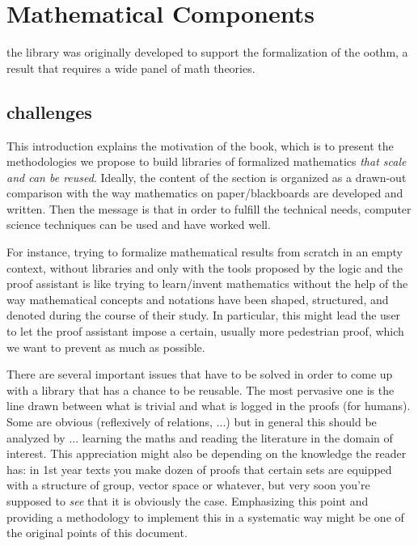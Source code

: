 \setcounter{chapter}{-1}
\chapter{Mathematical Components}

the library was originally developed to support the formalization
of the oothm, a result that requires a wide panel of math theories.

\section{challenges}




This introduction explains the motivation of the book, which is to
present the methodologies we propose to build libraries of formalized
mathematics \emph{that scale and can be reused}. Ideally, the content
of the section is organized as a drawn-out comparison with the way
mathematics on paper/blackboards are developed and written. Then the
message is that in order to fulfill the technical needs, computer
science techniques can be used and have worked well.

For instance, trying to formalize mathematical results from scratch in
an empty context, without libraries and only with the tools proposed
by the logic and the proof assistant is like trying to learn/invent
mathematics without the help of the way mathematical concepts and
notations have been shaped, structured, and denoted during the course
of their study. In particular, this might lead the user to let the
proof assistant impose a certain, usually more pedestrian proof, which
we want to prevent as much as possible.

There are several important issues that have to be solved in order to
come up with a library that has a chance to be reusable. The most
pervasive one is the line drawn between what is trivial and what is
logged in the proofs (for humans). Some are obvious (reflexively of
relations, ...) but in general this should be analyzed by
... learning the maths and reading the literature in the domain of
interest. This appreciation might also be depending on the knowledge
the reader has: in 1st year texts you make dozen of proofs that
certain sets are equipped with a structure of group, vector space or
whatever, but very soon you're supposed to \emph{see} that it is
obviously the case. Emphasizing this point and providing a methodology to
implement this in a systematic way might be one of the original points
of this document. 

